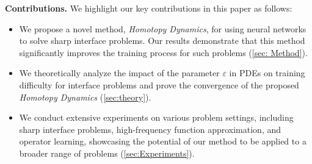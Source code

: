 
\textbf{Contributions.} We highlight our key contributions in this paper as follows:

\begin{itemize}%
\setlength\itemsep{-1pt}

\item We propose a novel method, \textit{Homotopy Dynamics}, for using neural networks to solve sharp interface problems. Our results demonstrate that this method significantly improves the training process for such problems (\cref{sec: Method}).
\item  We theoretically analyze the impact of the parameter $\varepsilon$ in PDEs on training difficulty for interface problems and prove the convergence of the proposed \textit{Homotopy Dynamics} (\cref{sec:theory}).
\item We conduct extensive experiments on various problem settings, including sharp interface problems, high-frequency function approximation, and operator learning, showcasing the potential of our method to be applied to a broader range of problems (\cref{sec:Experiments}).

\end{itemize}

